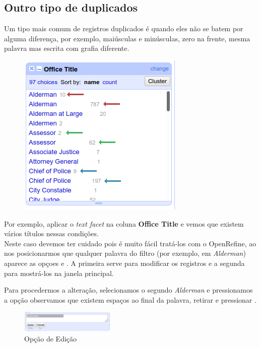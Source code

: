 \documentclass[a4paper,11pt]{article}
\begin{document}
\subsection{Outro tipo de duplicados}
Um tipo mais comum de registros duplicados é quando eles não se batem por alguma diferença, por exemplo, maiúsculas e minúsculas, zero na frente, mesma palavra mas escrita com grafia diferente. 

\begin{minipage}{\textwidth}
	\vspace{5pt}
	\begin{figure}
		\vspace{-\baselineskip}
		\includegraphics[width=0.9\linewidth]{imagem/duplicados.png} 
	\end{figure}
	Por exemplo, aplicar o \textit{text facet} na coluna \textbf{Office Title} e vemos que existem vários títulos nessas condições. \\[3mm]
	Neste caso devemos ter cuidado pois é muito fácil tratá-los com o OpenRefine, ao nos posicionarmos que qualquer palavra do filtro (por exemplo, em \textit{Alderman}) aparece as opçoes  e . A primeira serve para modificar os registros e a segunda para mostrá-los na janela principal.
\end{minipage}

Para procedermos a alteração, selecionamos o segundo \textit{Alderman} e pressionamos a opção  observamos que existem espaços ao final da palavra, retirar e pressionar .
\begin{figure}[H]
	\centering
	\includegraphics[width=0.4\textwidth]{imagem/duplicados2.png}
	\caption{Opção de Edição}
\end{figure}
\end{document}
